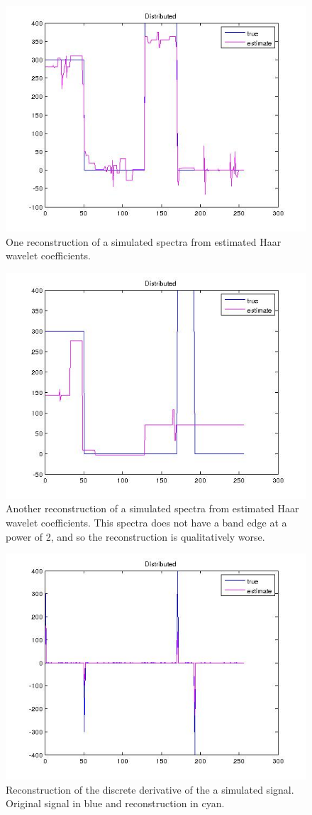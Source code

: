 \documentclass{article}
\begin{document}
\begin{appendices}
\begin{figure}[h]
\centering
\includegraphics[height = 7.3 cm]{recon170815.jpg}
\caption{One reconstruction of a simulated spectra from estimated Haar wavelet coefficients.}
\label{fig:wavelet_recon}
\end{figure}

\begin{figure}[h]
\centering
\includegraphics[height = 7.3 cm]{recon_new_bar.jpg}
\caption{Another reconstruction of a simulated spectra from estimated Haar wavelet coefficients. This spectra does not have a band edge at a power of 2, and so the reconstruction is qualitatively worse.}
\label{fig:wavelet_recon_no_pwer_2}
\end{figure}

\begin{figure}[h]
\centering
\includegraphics[height = 7.3 cm]{recon_difference.jpg}
\caption{Reconstruction of the discrete derivative of the a simulated signal. Original signal in blue and reconstruction in cyan.}
\label{fig:erroriterations}
\end{figure}


\end{appendices}
\end{document}
